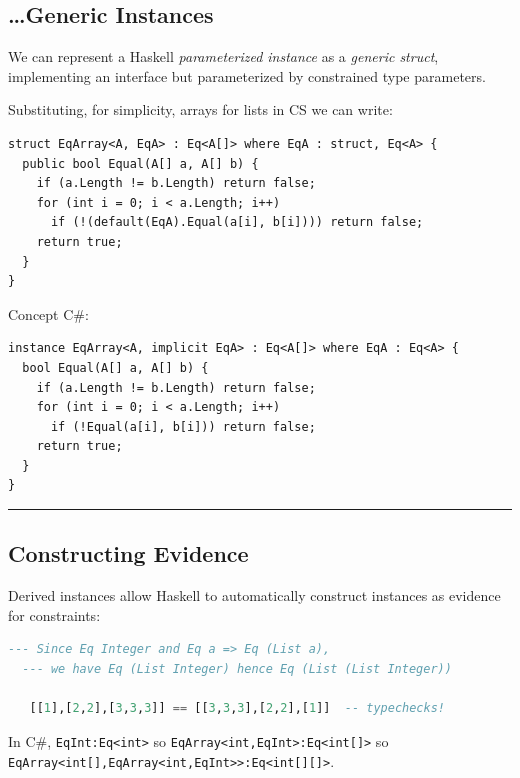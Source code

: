 \subsection{\ldots{}Generic Instances}\label{generic-instances-1}

We can represent a Haskell \emph{parameterized instance} as a
\emph{generic struct},\\
implementing an interface but parameterized by constrained type
parameters.

Substituting, for simplicity, arrays for lists in CS we can write:

\begin{lstlisting}
struct EqArray<A, EqA> : Eq<A[]> where EqA : struct, Eq<A> {
  public bool Equal(A[] a, A[] b) {
    if (a.Length != b.Length) return false;
    for (int i = 0; i < a.Length; i++)
      if (!(default(EqA).Equal(a[i], b[i]))) return false;
    return true;
  }
}
\end{lstlisting}

Concept C\#:

\begin{lstlisting}
instance EqArray<A, implicit EqA> : Eq<A[]> where EqA : Eq<A> {
  bool Equal(A[] a, A[] b) {
    if (a.Length != b.Length) return false;
    for (int i = 0; i < a.Length; i++)
      if (!Equal(a[i], b[i])) return false;
    return true;
  }
}
\end{lstlisting}

\begin{center}\rule{0.5\linewidth}{\linethickness}\end{center}

\subsection{Constructing Evidence}\label{constructing-evidence}

Derived instances allow Haskell to automatically construct instances as
evidence for constraints:

\begin{lstlisting}[language=Haskell]
  --- Since Eq Integer and Eq a => Eq (List a),
  --- we have Eq (List Integer) hence Eq (List (List Integer))
   
   [[1],[2,2],[3,3,3]] == [[3,3,3],[2,2],[1]]  -- typechecks!
\end{lstlisting}

In C\#, \lstinline!EqInt:Eq<int>! so
\lstinline!EqArray<int,EqInt>:Eq<int[]>! so
\lstinline!EqArray<int[],EqArray<int,EqInt>>:Eq<int[][]>!.

